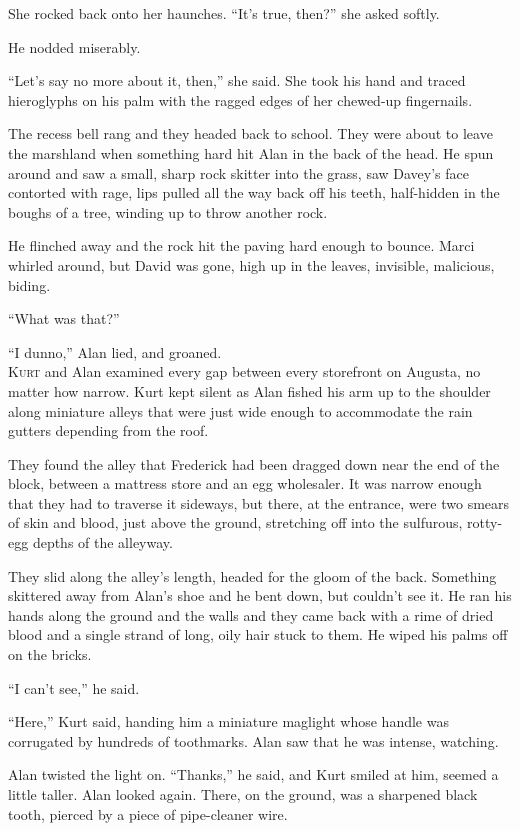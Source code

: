 \documentclass{article}
\begin{document}
She rocked back onto her haunches.  ``It's true, then?'' she asked
softly.

He nodded miserably.

``Let's say no more about it, then,'' she said.  She took his hand and
traced hieroglyphs on his palm with the ragged edges of her chewed-up
fingernails.

The recess bell rang and they headed back to school.  They were about
to leave the marshland when something hard hit Alan in the back of the
head.  He spun around and saw a small, sharp rock skitter into the
grass, saw Davey's face contorted with rage, lips pulled all the way
back off his teeth, half-hidden in the boughs of a tree, winding up to
throw another rock.

He flinched away and the rock hit the paving hard enough to bounce. 
Marci whirled around, but David was gone, high up in the leaves,
invisible, malicious, biding.

``What was that?''

``I dunno,'' Alan lied, and groaned.
\\
\lettrine[lines=3, lhang=.5, nindent=0pt, findent=2pt]{K}{urt} and Alan examined every gap between every storefront on Augusta,
no matter how narrow.  Kurt kept silent as Alan fished his arm up to
the shoulder along miniature alleys that were just wide enough to
accommodate the rain gutters depending from the roof.

They found the alley that Frederick had been dragged down near the end
of the block, between a mattress store and an egg wholesaler.  It was
narrow enough that they had to traverse it sideways, but there, at the
entrance, were two smears of skin and blood, just above the ground,
stretching off into the sulfurous, rotty-egg depths of the alleyway.

They slid along the alley's length, headed for the gloom of the back. 
Something skittered away from Alan's shoe and he bent down, but
couldn't see it.  He ran his hands along the ground and the walls and
they came back with a rime of dried blood and a single strand of long,
oily hair stuck to them.  He wiped his palms off on the bricks.

``I can't see,'' he said.

``Here,'' Kurt said, handing him a miniature maglight whose handle was
corrugated by hundreds of toothmarks.  Alan saw that he was intense,
watching.

Alan twisted the light on.  ``Thanks,'' he said, and Kurt smiled at
him, seemed a little taller.  Alan looked again.  There, on the
ground, was a sharpened black tooth, pierced by a piece of
pipe-cleaner wire.
\end{document}
